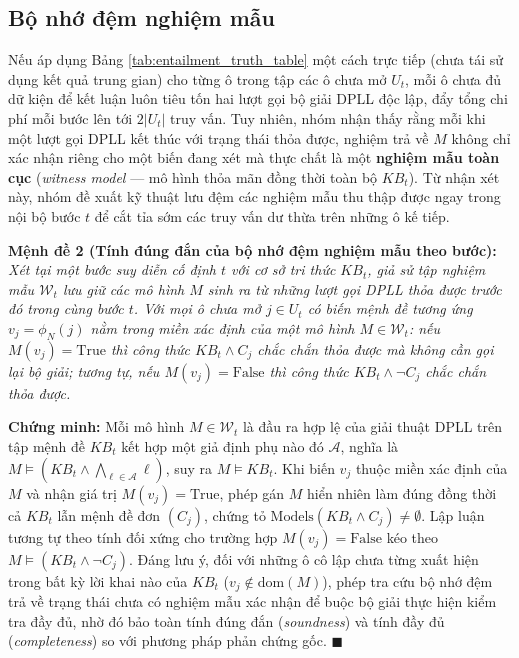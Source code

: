 \subsection{Bộ nhớ đệm nghiệm mẫu}
\label{subsec:witness_cache}
Nếu áp dụng Bảng \ref{tab:entailment_truth_table} một cách trực tiếp (chưa tái sử
dụng kết quả trung gian) cho từng ô trong tập các ô chưa mở $U_t$, mỗi ô chưa đủ
dữ kiện để kết luận luôn tiêu tốn hai lượt gọi bộ giải DPLL độc lập, đẩy tổng chi
phí mỗi bước lên tới $2|U_t|$ truy vấn. Tuy nhiên, nhóm nhận thấy rằng mỗi khi một
lượt gọi DPLL kết thúc với trạng thái thỏa được, nghiệm trả về $M$ không chỉ xác
nhận riêng cho một biến đang xét mà thực chất là một \textbf{nghiệm mẫu toàn cục}
(\textit{witness model} --- mô hình thỏa mãn đồng thời toàn bộ $KB_t$). Từ nhận
xét này, nhóm đề xuất kỹ thuật lưu đệm các nghiệm mẫu thu thập được ngay trong
nội bộ bước $t$ để cắt tỉa sớm các truy vấn dư thừa trên những ô kế tiếp.

\noindent\textbf{Mệnh đề 2 (Tính đúng đắn của bộ nhớ đệm nghiệm mẫu theo bước):}
\textit{Xét tại một bước suy diễn cố định $t$ với cơ sở tri thức $KB_t$, giả sử
tập nghiệm mẫu $\mathcal{W}_t$ lưu giữ các mô hình $M$ sinh ra từ những lượt gọi
DPLL thỏa được trước đó trong cùng bước $t$. Với mọi ô chưa mở $j \in U_t$ có
biến mệnh đề tương ứng $v_j = \phi_N(j)$ nằm trong miền xác định của một mô hình
$M \in \mathcal{W}_t$: nếu $M(v_j) = \text{True}$ thì công thức $KB_t \wedge C_j$
chắc chắn thỏa được mà không cần gọi lại bộ giải; tương tự, nếu
$M(v_j) = \text{False}$ thì công thức $KB_t \wedge \neg C_j$ chắc chắn thỏa được.}

\noindent\textbf{Chứng minh:}
Mỗi mô hình $M \in \mathcal{W}_t$ là đầu ra hợp lệ của giải thuật DPLL trên tập
mệnh đề $KB_t$ kết hợp một giả định phụ nào đó $\mathcal{A}$, nghĩa là $M \models
(KB_t \wedge \bigwedge_{\ell \in \mathcal{A}} \ell)$, suy ra $M \models KB_t$. Khi
biến $v_j$ thuộc miền xác định của $M$ và nhận giá trị $M(v_j) = \text{True}$,
phép gán $M$ hiển nhiên làm đúng đồng thời cả $KB_t$ lẫn mệnh đề đơn $(C_j)$,
chứng tỏ $\mathrm{Models}(KB_t \wedge C_j) \ne \emptyset$. Lập luận tương tự theo
tính đối xứng cho trường hợp $M(v_j) = \text{False}$ kéo theo $M \models (KB_t
\wedge \neg C_j)$. Đáng lưu ý, đối với những ô cô lập chưa từng xuất hiện trong
bất kỳ lời khai nào của $KB_t$ ($v_j \notin \mathrm{dom}(M)$), phép tra cứu bộ nhớ
đệm trả về trạng thái chưa có nghiệm mẫu xác nhận để buộc bộ giải thực hiện kiểm
tra đầy đủ, nhờ đó bảo toàn tính đúng đắn (\textit{soundness}) và tính đầy đủ
(\textit{completeness}) so với phương pháp phản chứng gốc. $\blacksquare$

